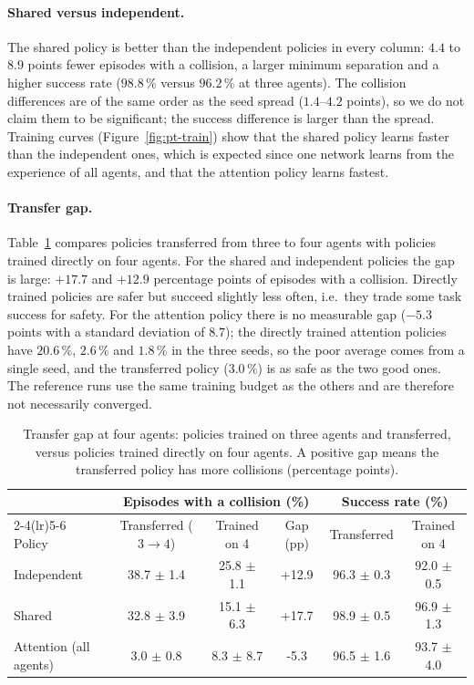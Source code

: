 \paragraph{Shared versus independent.}
The shared policy is better than the independent policies in every column: $4.4$ to $8.9$ points fewer episodes with a
collision, a larger minimum separation and a higher success rate ($98.8\,\%$ versus $96.2\,\%$ at three agents). The
collision differences are of the same order as the seed spread ($1.4$--$4.2$ points), so we do not claim them to be
significant; the success difference is larger than the spread. Training curves
(Figure~\ref{fig:pt-train}) show that the shared policy learns faster than the independent ones, which is expected
since one network learns from the experience of all agents, and that the attention policy learns fastest.

\paragraph{Transfer gap.}
Table~\ref{tab:pt-gap} compares policies transferred from three to four agents with policies trained directly on four
agents. For the shared and independent policies the gap is large: $+17.7$ and $+12.9$ percentage points of episodes with a
collision. Directly trained policies are safer but succeed slightly less often, i.e.\ they trade some task success for
safety. For the attention policy there is no measurable gap ($-5.3$ points with a standard deviation of $8.7$); the
directly trained attention policies have $20.6\,\%$, $2.6\,\%$ and $1.8\,\%$ in the three seeds, so the poor average
comes from a single seed, and the transferred policy ($3.0\,\%$) is as safe as the two good ones. The reference runs use
the same training budget as the others and are therefore not necessarily converged.

\begin{table}[t]
  \centering\small
  \caption{Transfer gap at four agents: policies trained on three agents and transferred, versus policies trained
  directly on four agents. A positive gap means the transferred policy has more collisions (percentage points).}
  \label{tab:pt-gap}
\begin{tabular}{l cc c cc}
\toprule
 & \multicolumn{3}{c}{Episodes with a collision (\%)} & \multicolumn{2}{c}{Success rate (\%)} \\
\cmidrule(lr){2-4}\cmidrule(lr){5-6}
Policy & Transferred ($3\!\to\!4$) & Trained on 4 & Gap (pp) & Transferred & Trained on 4 \\
\midrule
Independent & 38.7 $\pm$ 1.4 & 25.8 $\pm$ 1.1 & +12.9 & 96.3 $\pm$ 0.3 & 92.0 $\pm$ 0.5 \\
Shared & 32.8 $\pm$ 3.9 & 15.1 $\pm$ 6.3 & +17.7 & 98.9 $\pm$ 0.5 & 96.9 $\pm$ 1.3 \\
Attention (all agents) & 3.0 $\pm$ 0.8 & 8.3 $\pm$ 8.7 & -5.3 & 96.5 $\pm$ 1.6 & 93.7 $\pm$ 4.0 \\
\bottomrule
\end{tabular}
\end{table}

